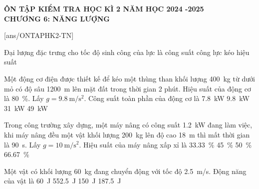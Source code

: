 \begin{center}
	\textbf{ÔN TẬP KIỂM TRA HỌC KÌ 2 NĂM HỌC 2024 -2025}\\
	\textbf{CHƯƠNG 6: NĂNG LƯỢNG}
\end{center}
[ans/ONTAPHK2-TN]

\begin{ex}
	Đại lượng đặc trưng cho tốc độ sinh công của lực là
	\choice
	{\True công suất}
	{công}
	{lực kéo}
	{hiệu suất}
	\loigiai{}
\end{ex}
\begin{ex}
	Một động cơ điện được thiết kế để kéo một thùng than khối lượng \SI{400}{\kilogram} từ dưới mỏ có độ sâu \SI{1200}{\meter} lên mặt đất trong thời gian 2 phút. Hiệu suất của động cơ là \SI{80}{\percent}. Lấy $g=\SI{9.8}{\meter/\second^2}$. Công suất toàn phần của động cơ là
	\choice
	{\SI{7.8}{\kilo\watt}}
	{\SI{9.8}{\kilo\watt}}
	{\SI{31}{\kilo\watt}}
	{\True \SI{49}{\kilo\watt}}
	\loigiai{}
\end{ex}
\begin{ex}
	Trong công trường xây dựng, một máy nâng có công suất \SI{1.2}{\kilo\watt} đang làm việc, khi máy nâng đều một vật khối lượng \SI{200}{\kilo\gram} lên độ cao \SI{18}{\meter} thì mất thời gian là \SI{90}{\second}. Lấy $g=\SI{10}{\meter/\second^2}$. Hiệu suất của máy nâng xấp xỉ là
	\choice
	{\True \SI{33.33}{\percent}}
	{\SI{45}{\percent}}
	{\SI{50}{\percent}}
	{\SI{66.67}{\percent}}
	\loigiai{}
\end{ex}



\begin{ex}
	Một vật có khối lượng \SI{60}{\kilogram} đang chuyển động với tốc độ \SI{2.5}{\meter/\second}. Động năng của vật là
	\choice
	{\SI{60}{\joule}}
	{\SI{552.5}{\joule}}
	{\SI{150}{\joule}}
	{\True \SI{187.5}{\joule}}
	\loigiai{}
\end{ex}


